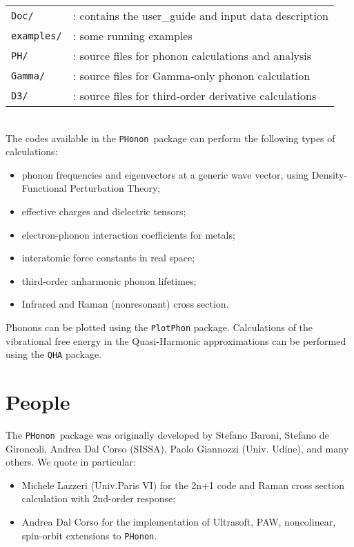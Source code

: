 \documentclass[12pt,a4paper]{article}
\def\PHonon{\texttt{PHonon}}
\begin{document}
\begin{tabular}{ll}
\texttt{Doc/} & : contains the user\_guide and input data description \\
\texttt{examples/} & : some running examples \\
\texttt{PH/}      & : source files for phonon calculations 
                   and analysis\\
\texttt{Gamma/}  & : source files for Gamma-only phonon calculation\\
\texttt{D3/}     & : source files for third-order derivative
                  calculations \\
\end{tabular}\\
The codes available in the \PHonon\ package can perform the following 
types of calculations:
\begin{itemize}
  \item phonon frequencies and eigenvectors at a generic wave vector,
  using Density-Functional Perturbation Theory;
  \item effective charges and dielectric tensors;
  \item electron-phonon interaction coefficients for metals;
  \item interatomic force constants in real space;
  \item third-order anharmonic phonon lifetimes;
  \item Infrared and Raman (nonresonant) cross section.
\end{itemize}

Phonons can be plotted using the \texttt{PlotPhon} package.
Calculations of the vibrational free energy in the Quasi-Harmonic 
approximations can be performed using the \texttt{QHA}  package.

\section{People}
The \PHonon\ package
was originally developed by Stefano Baroni, Stefano
de Gironcoli, Andrea Dal Corso (SISSA), Paolo Giannozzi (Univ. Udine), 
and many others.
We quote in particular:
\begin{itemize}
  \item Michele Lazzeri (Univ.Paris VI) for the 2n+1 code and Raman 
  cross section calculation with 2nd-order response;
 \item Andrea Dal Corso for the implementation of Ultrasoft, PAW,
  noncolinear, spin-orbit extensions to \PHonon.
\end{itemize}
\end{document}
